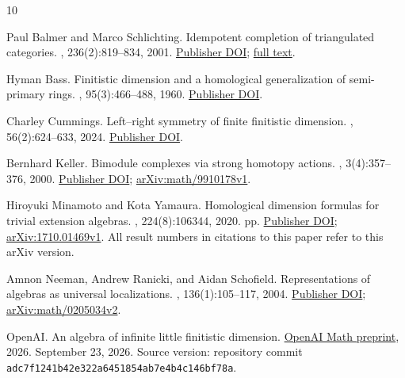 \documentclass[11pt]{article}
\numberwithin{equation}{section}
\theoremstyle{definition}
\theoremstyle{remark}
\begin{document}
\begin{thebibliography}{10}

Paul Balmer and Marco Schlichting.
\newblock Idempotent completion of triangulated categories.
, 236(2):819--834, 2001.
\newblock \href{https://doi.org/10.1006/jabr.2000.8529}{Publisher DOI};
  \href{https://webhomes.maths.ed.ac.uk/~v1ranick/papers/balmschl.pdf}{full
  text}.

Hyman Bass.
\newblock Finitistic dimension and a homological generalization of semi-primary
  rings.
,
  95(3):466--488, 1960.
\newblock \href{https://doi.org/10.1090/S0002-9947-1960-0157984-8}{Publisher
  DOI}.

Charley Cummings.
\newblock Left--right symmetry of finite finitistic dimension.
, 56(2):624--633,
  2024.
\newblock \href{https://doi.org/10.1112/blms.12954}{Publisher DOI}.

Bernhard Keller.
\newblock Bimodule complexes via strong homotopy actions.
, 3(4):357--376, 2000.
\newblock \href{https://doi.org/10.1023/A:1009954126727}{Publisher DOI};
  \href{https://arxiv.org/abs/math/9910178v1}{arXiv:math/9910178v1}.

Hiroyuki Minamoto and Kota Yamaura.
\newblock Homological dimension formulas for trivial extension algebras.
, 224(8):106344, 2020.
 pp. \href{https://doi.org/10.1016/j.jpaa.2020.106344}{Publisher
  DOI}; \href{https://arxiv.org/abs/1710.01469v1}{arXiv:1710.01469v1}. All
  result numbers in citations to this paper refer to this arXiv version.

Amnon Neeman, Andrew Ranicki, and Aidan Schofield.
\newblock Representations of algebras as universal localizations.
, 136(1):105--117, 2004.
\newblock \href{https://doi.org/10.1017/S030500410300700X}{Publisher DOI};
  \href{https://arxiv.org/abs/math/0205034v2}{arXiv:math/0205034v2}.

{OpenAI}.
\newblock An algebra of infinite little finitistic dimension.
\newblock
  \href{https://github.com/openai/math/tree/adc7f1241b42e322a6451854ab7e4b4c146bf78a/preprints/An-algebra-of-infinite-little-finitistic-dimension-September-23-2026}{OpenAI
  Math preprint}, 2026.
\newblock September 23, 2026. Source version: repository commit
  \texttt{adc7f1241b42e322a6451854ab7e4b4c146bf78a}.


\end{thebibliography}
\end{document}
